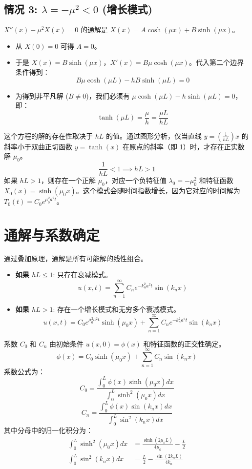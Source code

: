 \documentclass{article}
\begin{document}
	\subsection{情况 3: $\lambda = -\mu^2 < 0$ (增长模式)}
	$X''(x) - \mu^2 X(x) = 0$ 的通解是 $X(x) = A\cosh(\mu x) + B\sinh(\mu x)$。
	\begin{itemize}
		\item 从 $X(0)=0$ 可得 $A=0$。
		\item 于是 $X(x) = B\sinh(\mu x)$，$X'(x) = B\mu\cosh(\mu x)$。代入第二个边界条件得到：
		$$
		B\mu\cosh(\mu L) - hB\sinh(\mu L) = 0
		$$
		\item 为得到非平凡解 ($B \neq 0$)，我们必须有 $\mu\cosh(\mu L) - h\sinh(\mu L) = 0$，即：
		$$
		\tanh(\mu L) = \frac{\mu}{h} = \frac{\mu L}{hL}
		$$
	\end{itemize}
	这个方程的解的存在性取决于 $hL$ 的值。通过图形分析，仅当直线 $y = (\frac{1}{hL})x$ 的斜率小于双曲正切函数 $y=\tanh(x)$ 在原点的斜率（即 1）时，才存在正实数解 $\mu_0$。
	$$
	\frac{1}{hL} < 1 \implies hL > 1
	$$
	如果 $hL>1$，则存在一个正解 $\mu_0$，对应一个负特征值 $\lambda_0 = -\mu_0^2$ 和特征函数 $X_0(x) = \sinh(\mu_0 x)$。这个模式会随时间指数增长，因为它对应的时间解为 $T_0(t) = C_0 e^{\mu_0^2 a^2 t}$。
	
	\section{通解与系数确定}
	通过叠加原理，通解是所有可能解的线性组合。
	
	\begin{itemize}
		\item \textbf{如果 $hL \le 1$}: 只存在衰减模式。
		$$
		u(x,t) = \sum_{n=1}^{\infty} C_n e^{-k_n^2 a^2 t} \sin(k_n x)
		$$
		\item \textbf{如果 $hL > 1$}: 存在一个增长模式和无穷多个衰减模式。
		$$
		u(x,t) = C_0 e^{\mu_0^2 a^2 t} \sinh(\mu_0 x) + \sum_{n=1}^{\infty} C_n e^{-k_n^2 a^2 t} \sin(k_n x)
		$$
	\end{itemize}
	系数 $C_0$ 和 $C_n$ 由初始条件 $u(x,0) = \phi(x)$ 和特征函数的正交性确定。
	$$
	\phi(x) = C_0 \sinh(\mu_0 x) + \sum_{n=1}^{\infty} C_n \sin(k_n x)
	$$
	系数公式为：
	$$
	C_0 = \frac{\int_0^L \phi(x) \sinh(\mu_0 x) dx}{\int_0^L \sinh^2(\mu_0 x) dx}
	$$
	$$
	C_n = \frac{\int_0^L \phi(x) \sin(k_n x) dx}{\int_0^L \sin^2(k_n x) dx}
	$$
	其中分母中的归一化积分为：
	\begin{align*}
		\int_0^L \sinh^2(\mu_0 x) dx &= \frac{\sinh(2\mu_0 L)}{4\mu_0} - \frac{L}{2} \\
		\int_0^L \sin^2(k_n x) dx &= \frac{L}{2} - \frac{\sin(2k_n L)}{4k_n}
	\end{align*}
	
\end{document}
